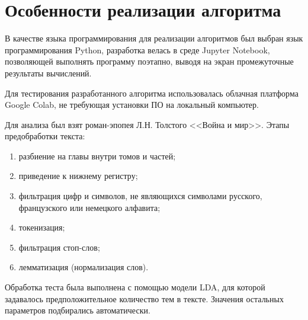\chapter{Особенности реализации алгоритма}

В качестве языка программирования для реализации алгоритмов был выбран язык программирования Python, разработка велась в среде Jupyter Notebook, позволяющей выполнять программу поэтапно, выводя на экран промежуточные результаты вычислений.

Для тестирования разработанного алгоритма использовалась облачная платформа Google Colab, не требующая установки ПО на локальный компьютер.

Для анализа был взят роман-эпопея Л.Н. Толстого <<Война и мир>>. Этапы предобработки текста:
\begin{enumerate}[label*=\arabic*)]
	\item разбиение на главы внутри томов и частей;
	\item приведение к нижнему регистру;
	\item фильтрация цифр и символов, не являющихся символами русского, французского или немецкого алфавита;
	\item токенизация;
	\item фильтрация стоп-слов;
	\item лемматизация (нормализация слов).
\end{enumerate}

Обработка теста была выполнена с помощью модели LDA, для которой задавалось предположительное количество тем в тексте. Значения остальных параметров подбирались автоматически.

\clearpage
